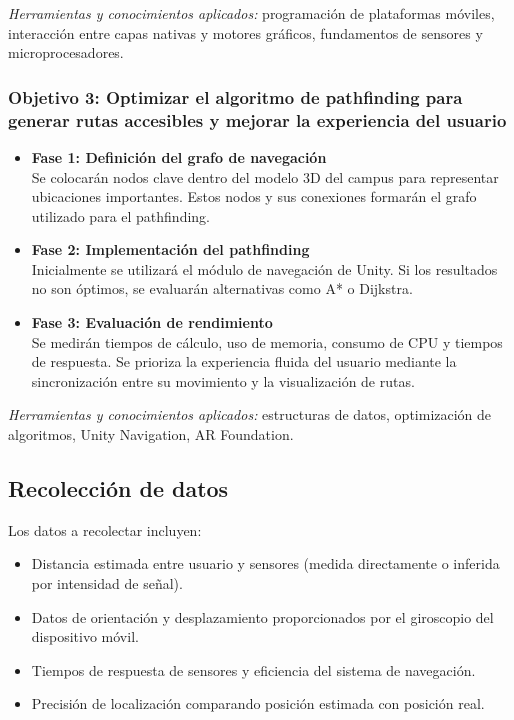 \documentclass{article}
\begin{document}
\textit{Herramientas y conocimientos aplicados:} programación de plataformas móviles, interacción entre capas nativas y motores gráficos, fundamentos de sensores y microprocesadores.

\subsubsection{Objetivo 3: Optimizar el algoritmo de pathfinding para generar rutas accesibles y mejorar la experiencia del usuario}

\begin{itemize}
    \item \textbf{Fase 1: Definición del grafo de navegación} \\
    Se colocarán nodos clave dentro del modelo 3D del campus para representar ubicaciones importantes. Estos nodos y sus conexiones formarán el grafo utilizado para el pathfinding.

    \item \textbf{Fase 2: Implementación del pathfinding} \\
    Inicialmente se utilizará el módulo de navegación de Unity. Si los resultados no son óptimos, se evaluarán alternativas como A* o Dijkstra.

    \item \textbf{Fase 3: Evaluación de rendimiento} \\
    Se medirán tiempos de cálculo, uso de memoria, consumo de CPU y tiempos de respuesta. Se prioriza la experiencia fluida del usuario mediante la sincronización entre su movimiento y la visualización de rutas.
\end{itemize}

\textit{Herramientas y conocimientos aplicados:} estructuras de datos, optimización de algoritmos, Unity Navigation, AR Foundation.

\subsection{Recolección de datos}

Los datos a recolectar incluyen:

\begin{itemize}
    \item Distancia estimada entre usuario y sensores (medida directamente o inferida por intensidad de señal).
    \item Datos de orientación y desplazamiento proporcionados por el giroscopio del dispositivo móvil.
    \item Tiempos de respuesta de sensores y eficiencia del sistema de navegación.
    \item Precisión de localización comparando posición estimada con posición real.
\end{itemize}
\end{document}

